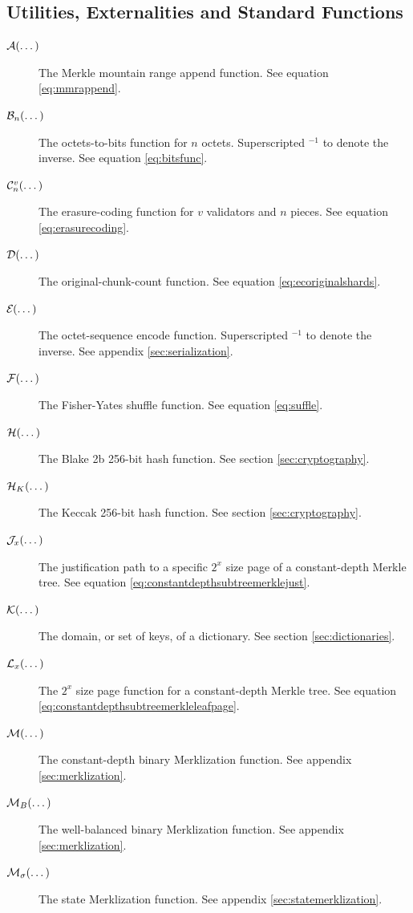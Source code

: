 \subsection{Utilities, Externalities and Standard Functions}

\begin{description}
  \item[$\mathcal{A}(\dots)$] The Merkle mountain range append function. See equation \ref{eq:mmrappend}.
  \item[$\mathcal{B}_{n}(\dots)$] The octets-to-bits function for $n$ octets. Superscripted ${}^{-1}$ to denote the inverse. See equation \ref{eq:bitsfunc}.
  \item[$\erasurecode{v}{n}{\dots}$] The erasure-coding function for $v$ validators and $n$ pieces. See equation \ref{eq:erasurecoding}.
  \item[$\mathcal{D}(\dots)$] The original-chunk-count function. See equation \ref{eq:ecoriginalshards}.
  \item[$\encode{\dots}$] The octet-sequence encode function. Superscripted ${}^{-1}$ to denote the inverse. See appendix \ref{sec:serialization}.
  \item[$\mathcal{F}(\dots)$] The Fisher-Yates shuffle function. See equation \ref{eq:suffle}.
  \item[$\blake{\dots}$] The Blake 2b 256-bit hash function. See section \ref{sec:cryptography}.
  \item[$\keccak{\dots}$] The Keccak 256-bit hash function. See section \ref{sec:cryptography}.


  \item[$\mathcal{J}_{x}(\dots)$] The justification path to a specific $2^x$ size page of a constant-depth Merkle tree. See equation \ref{eq:constantdepthsubtreemerklejust}.
  \item[$\keys{\dots}$] The domain, or set of keys, of a dictionary. See section \ref{sec:dictionaries}.
  \item[$\mathcal{L}_{x}(\dots)$] The $2^x$ size page function for a constant-depth Merkle tree. See equation \ref{eq:constantdepthsubtreemerkleleafpage}.
  \item[$\merklizecd{\dots}$] The constant-depth binary Merklization function. See appendix \ref{sec:merklization}.
  \item[$\merklizewb{\dots}$] The well-balanced binary Merklization function. See appendix \ref{sec:merklization}.
  \item[$\merklizestate{\dots}$] The state Merklization function. See appendix \ref{sec:statemerklization}.


\end{description}

